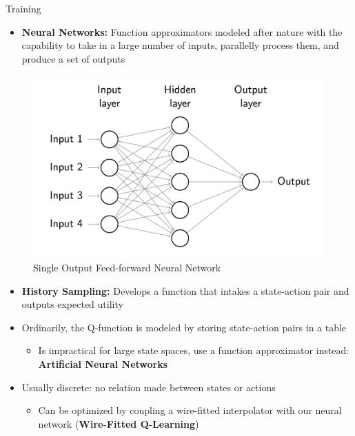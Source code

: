 \documentclass[final]{beamer}
\newlength{\onecolwid}
\newlength{\twocolwid}
\begin{document}
\begin{frame}[t]
\begin{columns}[t]
\begin{column}{\twocolwid}
\begin{columns}[t,totalwidth=\twocolwid]
	\begin{column}{\onecolwid}\begin{block}{Training}


	\begin{itemize}
		\item \textbf{Neural Networks:} Function approximators modeled after nature with the capability to take in a large number of inputs, parallelly process them, and produce a set of outputs
	\end{itemize}
	
	\begin{figure}
		\centering
		\includegraphics[width=.8\linewidth]{Figures/FeedForwardRendered}
		\caption{Single Output Feed-forward Neural Network}
		\label{fig:feedforward}
	\end{figure}

	\begin{itemize}
		\item \textbf{History Sampling:} Develops a function that intakes a state-action pair and outputs expected utility
		\item Ordinarily, the Q-function is modeled by storing state-action pairs in a table
		\begin{itemize}
			\item Is impractical for large state spaces, use a function approximator instead: \textbf{Artificial Neural Networks}
		\end{itemize}

		\item Usually discrete: no relation made between states or actions

		\begin{itemize}
			\item Can be optimized by coupling a wire-fitted interpolator with our neural network (\textbf{Wire-Fitted Q-Learning})
		\end{itemize}


\end{itemize}
\end{block}
\end{column}
\end{columns}
\end{column}
\end{columns}
\end{frame}
\end{document}
